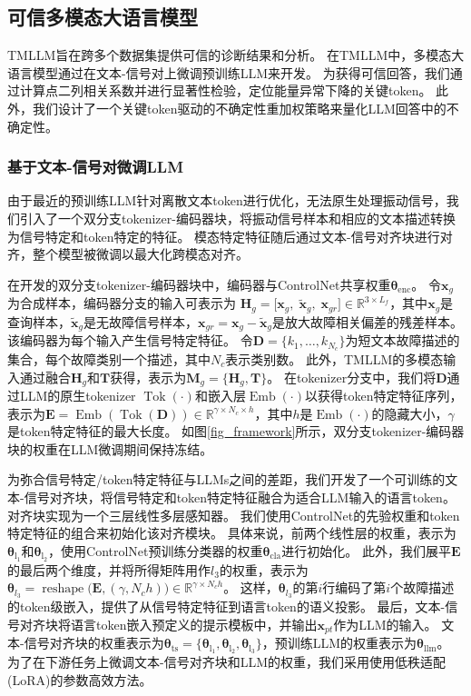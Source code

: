 \documentclass[UTF8,lettersize,journal]{IEEEtran}
\begin{document}
\subsection{可信多模态大语言模型}

TMLLM旨在跨多个数据集提供可信的诊断结果和分析。
在TMLLM中，多模态大语言模型通过在文本-信号对上微调预训练LLM来开发。
为获得可信回答，我们通过计算点二列相关系数并进行显著性检验，定位能量异常下降的关键token。
此外，我们设计了一个关键token驱动的不确定性重加权策略来量化LLM回答中的不确定性。

\subsubsection{基于文本-信号对微调LLM}
由于最近的预训练LLM针对离散文本token进行优化，无法原生处理振动信号，我们引入了一个双分支tokenizer-编码器块，将振动信号样本和相应的文本描述转换为信号特定和token特定的特征。
模态特定特征随后通过文本-信号对齐块进行对齐，整个模型被微调以最大化跨模态对齐。

在开发的双分支tokenizer-编码器块中，编码器与ControlNet共享权重$\bm{\theta}_\mathrm{enc}$。
令$\bm{x}_{g}$为合成样本，编码器分支的输入可表示为
$\bm{H}_{g} = \bigl[\bm{x}_{g},\;\tilde{\bm{x}}_{g},\;\bm{x}_{gr}\bigr] \in \mathbb{R}^{3 \times L_{f}}$，其中$\bm{x}_{g}$是查询样本，$\tilde{\bm{x}}_{g}$是无故障信号样本，$\bm{x}_{gr}=\bm{x}_{g}-\tilde{\bm{x}}_{g}$是放大故障相关偏差的残差样本。
该编码器为每个输入产生信号特定特征。
令$\bm{D}=\{k_{1},\dots,k_{N_c}\}$为短文本故障描述的集合，每个故障类别一个描述，其中$N_c$表示类别数。
此外，TMLLM的多模态输入通过融合$\bm{H}_{g}$和$\bm{T}$获得，表示为$\bm{M}_{g}=\{\bm{H}_{g},\bm{T}\}$。
在tokenizer分支中，我们将$\bm{D}$通过LLM的原生tokenizer $\operatorname{Tok}(\cdot)$和嵌入层$\operatorname{Emb}(\cdot)$以获得token特定特征序列，表示为$\bm{E}=\operatorname{Emb}(\operatorname{Tok}(\bm{D})) \in \mathbb{R}^{\gamma\times N_c\times h}$，其中$h$是$\operatorname{Emb}(\cdot)$的隐藏大小，$\gamma$是token特定特征的最大长度。
如图\ref{fig_framework}所示，双分支tokenizer-编码器块的权重在LLM微调期间保持冻结。

为弥合信号特定/token特定特征与LLMs之间的差距，我们开发了一个可训练的文本-信号对齐块，将信号特定和token特定特征融合为适合LLM输入的语言token。
对齐块实现为一个三层线性多层感知器。
我们使用ControlNet的先验权重和token特定特征的组合来初始化该对齐模块。
具体来说，前两个线性层的权重，表示为$\bm{\theta}_\mathrm{l_{1}}$和$\bm{\theta}_\mathrm{l_{2}}$，使用ControlNet预训练分类器的权重$\bm{\theta}_\mathrm{cla}$进行初始化。
此外，我们展平$\bm{E}$的最后两个维度，并将所得矩阵用作$l_{3}$的权重，表示为
$\boldsymbol{\theta}_{l_{3}} =\operatorname{reshape}\bigl(\bm{E},(\gamma,N_c h)\bigr)
\in\mathbb{R}^{\gamma\times N_c h}$。
这样，$\boldsymbol{\theta}_{l_{3}}$的第$i$行编码了第$i$个故障描述的token级嵌入，提供了从信号特定特征到语言token的语义投影。
最后，文本-信号对齐块将语言token嵌入预定义的提示模板中，并输出$\bm{x}_{pt}$作为LLM的输入。
文本-信号对齐块的权重表示为$\boldsymbol{\theta}_\mathrm{ts}=\{\bm{\theta}_\mathrm{l_{1}}, \bm{\theta}_\mathrm{l_{2}}, \bm{\theta}_\mathrm{l_{3}}\}$，预训练LLM的权重表示为$\boldsymbol{\theta}_\mathrm{llm}$。
为了在下游任务上微调文本-信号对齐块和LLM的权重，我们采用使用低秩适配(LoRA)\cite{20231213775448}的参数高效方法。
\end{document}
